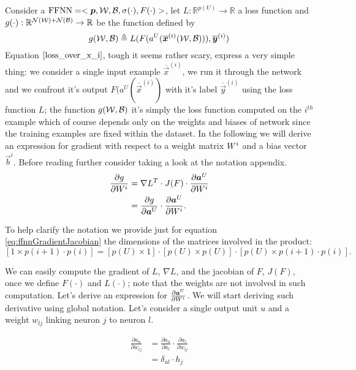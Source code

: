 Consider a $\mathrm{FFNN}=<\boldsymbol{p},\mathcal{W},\mathcal{B},\sigma(\cdot),F(\cdot)>$, let $L:\mathbb{R}^{p(U)} \rightarrow \mathbb{R}$ a loss function and 
$g(\cdot):\mathbb{R}^{\mathcal{N}(\mathcal{W})+\mathcal{N}(\mathcal{B})} \rightarrow \mathbb{R}$ be the function defined by
\begin{equation}
g(\mathcal{W},\mathcal{B}) \triangleq L(F(a^U( \overline{\boldsymbol{x}}^{(i)} (\mathcal{W},\mathcal{B}))),\overline{\boldsymbol{y}}^{(i)} )
\label{loss_over_x_i}
\end{equation}
Equation $\ref{loss_over_x_i}$, tough it seems rather scary, express a very simple thing: we consider a single input example 
$\overline{\vec{x}}^{(i)}$, we run it through the network and we confront it's output $F(a^U( \overline{\vec{x}}^{(i)}) $ with it's label
$\overline{\vec{y}}^{(i)}$ using the loss function $L$; the function $g(\mathcal{W},\mathcal{B})$ it's simply the loss function computed on the $i^{th}$ example
which of course depends only on the weights and biases of network since the training examples are fixed within the dataset. In the following we will derive an expression for gradient with respect to a weight matrix $W^{i}$ and a bias vector $\vec{b}^i$. Before reading further consider taking a look at the notation appendix.
\begin{align}
\label{eq:ffnnGradientJacobian}
\frac{\partial g}{\partial W^i} &= \nabla L^T \cdot J(F) \cdot \frac{\partial \boldsymbol{a}^U}{\partial W^i}\\
&= \frac{\partial g}{\partial \boldsymbol{a}^U} \cdot \frac{\partial \boldsymbol{a}^U}{\partial W^i}.
\end{align}

To help clarify the notation we provide just for equation \ref{eq:ffnnGradientJacobian} the dimensions of the matrices involved in the product:
$$[1\times p(i+1)\cdot p(i)] = [p(U)\times 1] \cdot [p(U)\times p(U)] \cdot [p(U)\times p(i+1)\cdot p(i)].$$ 

We can easily compute the gradient of $L$, $\nabla L$, and the jacobian of $F$, $J(F)$, once we define $F(\cdot)$ and $L(\cdot)$; note that the weights are not involved in such computation.
Let's derive an expression for $\frac{\partial \boldsymbol{a}^U}{\partial W^i}$.
We will start deriving such derivative using global notation. Let's consider a single output unit $u$ and a weight $w_{lj}$ linking neuron $j$ to neuron $l$.


\begin{align}
\frac{\partial a_u}{\partial w_{lj}} &= \frac{\partial a_u}{\partial a_l} \cdot \frac{\partial a_l}{\partial w_{lj}}\\
&=\delta_{ul} \cdot h_j
\end{align}

